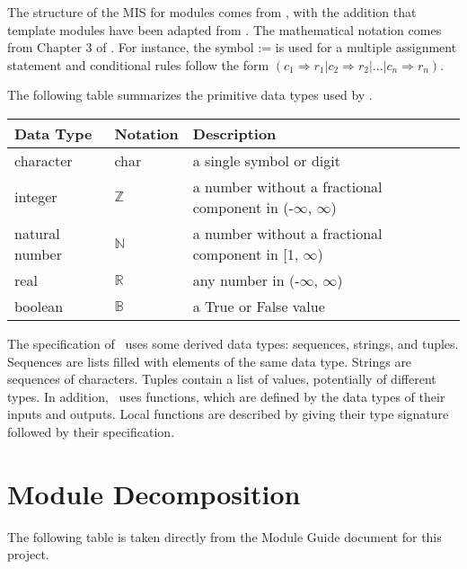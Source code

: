 \documentclass[12pt, titlepage]{article}
\begin{document}
	The structure of the MIS for modules comes from \citet{HoffmanAndStrooper1995},
	with the addition that template modules have been adapted from
	\cite{GhezziEtAl2003}.  The mathematical notation comes from Chapter 3 of
	\citet{HoffmanAndStrooper1995}.  For instance, the symbol := is used for a
	multiple assignment statement and conditional rules follow the form $(c_1
	\Rightarrow r_1 | c_2 \Rightarrow r_2 | ... | c_n \Rightarrow r_n )$.
	
	The following table summarizes the primitive data types used by \progname. 
	
	\begin{center}
		\renewcommand{\arraystretch}{1.2}
		\noindent 
		\begin{tabular}{l l p{7.5cm}} 
			\toprule 
			\textbf{Data Type} & \textbf{Notation} & \textbf{Description}\\ 
			\midrule
			character & char & a single symbol or digit\\
			integer & $\mathbb{Z}$ & a number without a fractional component in (-$\infty$, $\infty$) \\
			natural number & $\mathbb{N}$ & a number without a fractional component in [1, $\infty$) \\
			real & $\mathbb{R}$ & any number in (-$\infty$, $\infty$)\\
			boolean & $\mathbb{B}$ & a True or False value\\
			\bottomrule
		\end{tabular} 
	\end{center}
	
	\noindent
	The specification of \progname \ uses some derived data types: sequences, strings, and
	tuples. Sequences are lists filled with elements of the same data type. Strings
	are sequences of characters. Tuples contain a list of values, potentially of
	different types. In addition, \progname \ uses functions, which
	are defined by the data types of their inputs and outputs. Local functions are
	described by giving their type signature followed by their specification.
	
	\section{Module Decomposition}
	
	The following table is taken directly from the Module Guide document for this project.
	
\end{document}
